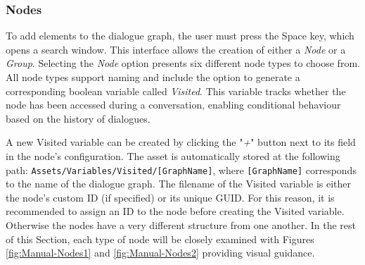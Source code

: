 \subsubsection{Nodes}
To add elements to the dialogue graph, the user must press the Space key, which opens a search window. This interface allows the creation of either a \textit{Node} or a \textit{Group}. Selecting the \textit{Node} option presents six different node types to choose from. All node types support naming and include the option to generate a corresponding boolean variable called \textit{Visited}. This variable tracks whether the node has been accessed during a conversation, enabling conditional behaviour based on the history of dialogues.

A new Visited variable can be created by clicking the "\textit{+}" button next to its field in the node's configuration. The asset is automatically stored at the following path: \verb|Assets/Variables/Visited/[GraphName]|, where \verb|[GraphName]| corresponds to the name of the dialogue graph. The filename of the Visited variable is either the node’s custom ID (if specified) or its unique GUID. For this reason, it is recommended to assign an ID to the node before creating the Visited variable. Otherwise the nodes have a very different structure from one another. In the rest of this Section, each type of node will be closely examined with Figures \ref{fig:Manual-Nodes1} and \ref{fig:Manual-Nodes2} providing visual guidance.

